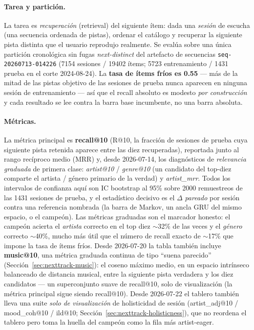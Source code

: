 \documentclass[11pt]{article}
\newcommand{\dsid}[1]{\texttt{\small #1}}
\begin{document}
\paragraph{Tarea y partición.} La tarea es \emph{recuperación} (retrieval) del
siguiente ítem: dada una \emph{sesión} de escucha (una secuencia ordenada de
pistas), ordenar el catálogo y recuperar la siguiente pista distinta que el
usuario reprodujo realmente. Se evalúa sobre una única partición cronológica sin
fugas \emph{next-distinct} del artefacto de secuencias \dsid{seq-20260713-014226}
(\num{7154} sesiones / \num{19402} ítems; \num{5723} entrenamiento / \num{1431}
prueba en el corte 2024-08-24). La \textbf{tasa de ítems fríos es 0.55} --- más de
la mitad de las pistas objetivo de las sesiones de prueba nunca aparecen en
ninguna sesión de entrenamiento --- así que el recall absoluto es modesto \emph{por
construcción} y cada resultado se lee contra la barra base incumbente, no una barra
absoluta.

\paragraph{Métricas.} La métrica principal es \textbf{recall@10} (R@10, la
fracción de sesiones de prueba cuya siguiente pista retenida aparece entre las
diez recuperadas), reportada junto al rango recíproco medio (MRR) y, desde
2026-07-14, los diagnósticos de \emph{relevancia graduada} de primera clase:
\emph{artist@10} / \emph{genre@10} (un candidato del top-diez comparte el artista
/ género primario de la verdad) y \emph{artist\_mrr}. Todos los intervalos de
confianza aquí son IC bootstrap al 95\% sobre \num{2000} remuestreos de las
\num{1431} sesiones de prueba, y el estadístico decisivo es el $\Delta$
\emph{pareado} por sesión contra una referencia nombrada (la barra de Markov, un
ancla GRU del mismo espacio, o el campeón). Las métricas graduadas son el marcador
honesto: el campeón acierta el \emph{artista} correcto en el top diez $\sim$32\% de
las veces y el \emph{género} correcto $\sim$40\%, mucho más útil que el número de
recall exacto de $\sim$17\% que impone la tasa de ítems fríos. Desde 2026-07-20 la
tabla también incluye \textbf{music@10}, una métrica graduada continua de tipo
``suena parecido'' (Sección~\ref{sec:nexttrack-music}): el coseno máximo medio, en un
espacio intrínseco balanceado de distancia musical, entre la siguiente pista
verdadera y los diez candidatos --- un superconjunto suave de recall@10, solo de
visualización (la métrica principal sigue siendo recall@10). Desde 2026-07-22 el
tablero también lleva una suite \emph{solo de visualización} de holisticidad de sesión
(artist\_adj@10 / mood\_coh@10 / ild@10; Sección~\ref{sec:nexttrack-holisticness}), que
no reordena el tablero pero toma la huella del campeón como la fila más artist-eager.
\end{document}
